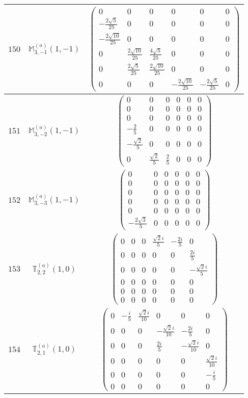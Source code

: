 \documentclass[fleqn,8pt,landscape]{jsarticle}
\begin{document}
\begin{center}
\begin{longtable}{ccc}
$ 150 $ & $ \mathbb{M}_{3,-1}^{(a)}(1,-1) $ & $ \begin{pmatrix} 0 & 0 & 0 & 0 & 0 & 0 \\ - \frac{2 \sqrt{5}}{25} & 0 & 0 & 0 & 0 & 0 \\ - \frac{2 \sqrt{10}}{25} & 0 & 0 & 0 & 0 & 0 \\ 0 & \frac{2 \sqrt{10}}{25} & \frac{4 \sqrt{5}}{25} & 0 & 0 & 0 \\ 0 & \frac{2 \sqrt{5}}{25} & \frac{2 \sqrt{10}}{25} & 0 & 0 & 0 \\ 0 & 0 & 0 & - \frac{2 \sqrt{10}}{25} & - \frac{2 \sqrt{5}}{25} & 0 \end{pmatrix} $ \\ \hline
$ 151 $ & $ \mathbb{M}_{3,-2}^{(a)}(1,-1) $ & $ \begin{pmatrix} 0 & 0 & 0 & 0 & 0 & 0 \\ 0 & 0 & 0 & 0 & 0 & 0 \\ 0 & 0 & 0 & 0 & 0 & 0 \\ - \frac{2}{5} & 0 & 0 & 0 & 0 & 0 \\ - \frac{\sqrt{2}}{5} & 0 & 0 & 0 & 0 & 0 \\ 0 & \frac{\sqrt{2}}{5} & \frac{2}{5} & 0 & 0 & 0 \end{pmatrix} $ \\ \hline
$ 152 $ & $ \mathbb{M}_{3,-3}^{(a)}(1,-1) $ & $ \begin{pmatrix} 0 & 0 & 0 & 0 & 0 & 0 \\ 0 & 0 & 0 & 0 & 0 & 0 \\ 0 & 0 & 0 & 0 & 0 & 0 \\ 0 & 0 & 0 & 0 & 0 & 0 \\ 0 & 0 & 0 & 0 & 0 & 0 \\ - \frac{2 \sqrt{3}}{5} & 0 & 0 & 0 & 0 & 0 \end{pmatrix} $ \\ \hline
$ 153 $ & $ \mathbb{T}_{2,2}^{(a)}(1,0) $ & $ \begin{pmatrix} 0 & 0 & 0 & \frac{\sqrt{2} i}{5} & - \frac{2 i}{5} & 0 \\ 0 & 0 & 0 & 0 & 0 & \frac{2 i}{5} \\ 0 & 0 & 0 & 0 & 0 & - \frac{\sqrt{2} i}{5} \\ 0 & 0 & 0 & 0 & 0 & 0 \\ 0 & 0 & 0 & 0 & 0 & 0 \\ 0 & 0 & 0 & 0 & 0 & 0 \end{pmatrix} $ \\ \hline
$ 154 $ & $ \mathbb{T}_{2,1}^{(a)}(1,0) $ & $ \begin{pmatrix} 0 & - \frac{i}{5} & \frac{\sqrt{2} i}{10} & 0 & 0 & 0 \\ 0 & 0 & 0 & - \frac{\sqrt{2} i}{10} & - \frac{2 i}{5} & 0 \\ 0 & 0 & 0 & \frac{2 i}{5} & - \frac{\sqrt{2} i}{10} & 0 \\ 0 & 0 & 0 & 0 & 0 & \frac{\sqrt{2} i}{10} \\ 0 & 0 & 0 & 0 & 0 & - \frac{i}{5} \\ 0 & 0 & 0 & 0 & 0 & 0 \end{pmatrix} $ \\ \hline

\end{longtable}
\end{center}
\end{document}
